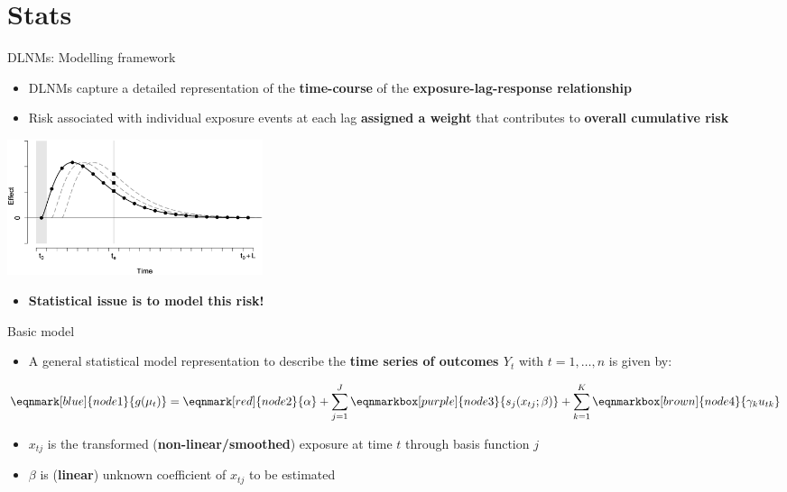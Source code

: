 \documentclass[english]{beamer}
\newcommand{\alertblue}[1]{{\color{blue}#1}}
\begin{document}
\section{Stats}
\begin{frame}{DLNMs: Modelling framework}
    \begin{itemize}
        \item DLNMs capture a detailed representation of the \alertblue{\textbf{time-course}} of the \alertblue{\textbf{exposure-lag-response relationship}}
         \item Risk associated with individual exposure events at each lag \alertblue{\textbf{assigned a weight}} that contributes to \alertblue{\textbf{overall cumulative risk}}
  \end{itemize}  
    \centering
    \includegraphics[width=7.5cm,keepaspectratio]{images/delayed effect.png}
  \begin{itemize}
      \item \textbf{\alertblue{Statistical issue is to model this risk!}}
  \end{itemize} 
\end{frame}
\begin{frame}{Basic model}
\begin{itemize}
    \item A general statistical model representation to describe the \alertblue{\textbf{time series of outcomes \( Y_t \)}} with \alertblue{\textbf{\( t = 1, \dots, n \)}} is given by: 
    \vspace{0.3cm}
\end{itemize}
\vspace{0.3cm}
\begin{equation*}
    \eqnmark[blue]{node1}{g(\mu_t)} =
    \eqnmark[red]{node2}{\alpha} +
    \sum_{j=1}^{J} \eqnmarkbox[purple]{node3}{s_j(x_{tj}; \beta)} +
    \sum_{k=1}^{K} \eqnmarkbox[brown]{node4}{\gamma_k u_{tk}}
\end{equation*}
\vspace{0.3cm}
\begin{itemize}
    \item \alertblue{\(x_{tj}\)} is the transformed (\alertblue{\textbf{non-linear/smoothed}}) exposure at time \alertblue{\(t\)} through basis function \alertblue{\(j\)}
    \vspace{0.3cm}
    \item \alertblue{\(\beta\)} is (\alertblue{\textbf{linear}}) unknown coefficient of \alertblue{\(x_{tj}\)} to be estimated
\end{itemize}
\end{frame}
\end{document}
